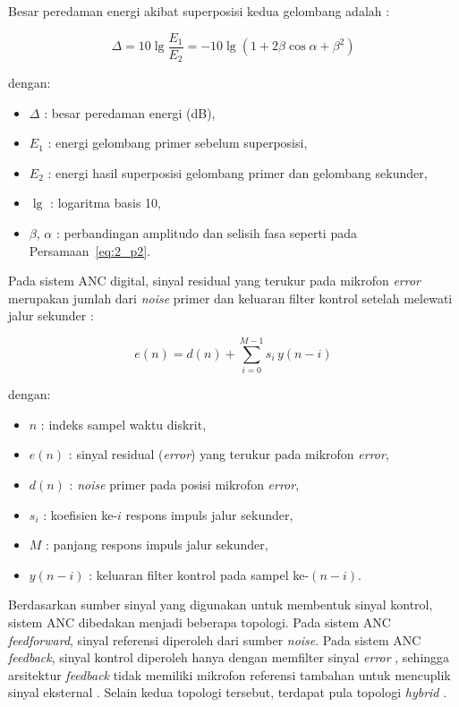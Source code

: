 Besar peredaman energi akibat superposisi kedua gelombang adalah \parencite{zhangrs2023}:

\begin{equation}
  \label{eq:2_reduksi}
  \Delta = 10\lg\frac{E_1}{E_2} = -10\lg\left(1 + 2\beta\cos\alpha + \beta^2\right)
\end{equation}

dengan:
\begin{itemize}[noitemsep, topsep=2pt]
  \item $\Delta$ : besar peredaman energi (dB),
  \item $E_1$ : energi gelombang primer sebelum superposisi,
  \item $E_2$ : energi hasil superposisi gelombang primer dan gelombang sekunder,
  \item $\lg$ : logaritma basis 10,
  \item $\beta$, $\alpha$ : perbandingan amplitudo dan selisih fasa seperti pada Persamaan~\eqref{eq:2_p2}.
\end{itemize}

Pada sistem ANC digital, sinyal residual yang terukur pada mikrofon \emph{error} merupakan jumlah dari \emph{noise} primer dan keluaran filter kontrol setelah melewati jalur sekunder \parencite{zhangrs2023,sarkar2025}:

\begin{equation}
  \label{eq:2_error}
  e(n) = d(n) + \sum_{i=0}^{M-1} s_i\, y(n-i)
\end{equation}

dengan:
\begin{itemize}[noitemsep, topsep=2pt]
  \item $n$ : indeks sampel waktu diskrit,
  \item $e(n)$ : sinyal residual (\emph{error}) yang terukur pada mikrofon \emph{error},
  \item $d(n)$ : \emph{noise} primer pada posisi mikrofon \emph{error},
  \item $s_i$ : koefisien ke-$i$ respons impuls jalur sekunder,
  \item $M$ : panjang respons impuls jalur sekunder,
  \item $y(n-i)$ : keluaran filter kontrol pada sampel ke-$(n-i)$.
\end{itemize}

Berdasarkan sumber sinyal yang digunakan untuk membentuk sinyal kontrol, sistem ANC dibedakan menjadi beberapa topologi. Pada sistem ANC \emph{feedforward}, sinyal referensi diperoleh dari sumber \emph{noise}. Pada sistem ANC \emph{feedback}, sinyal kontrol diperoleh hanya dengan memfilter sinyal \emph{error} \parencite{zhangrs2023}, sehingga arsitektur \emph{feedback} tidak memiliki mikrofon referensi tambahan untuk mencuplik sinyal eksternal \parencite{chen2025}. Selain kedua topologi tersebut, terdapat pula topologi \emph{hybrid} \parencite{chen2025,zhangrs2023}.

